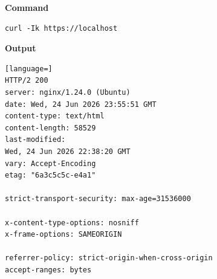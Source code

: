 \documentclass[11pt,a4paper,DIV=16,headings=normal,parskip=half]{scrartcl}
\begin{document}
\noindent
\begin{minipage}[t]{0.32\textwidth}
\textbf{Command}
\begin{lstlisting}
curl -Ik https://localhost
\end{lstlisting}
\end{minipage}
\hfill
\begin{minipage}[t]{0.64\textwidth}
\textbf{Output}
\begin{lstlisting}[language=]
HTTP/2 200
server: nginx/1.24.0 (Ubuntu)
date: Wed, 24 Jun 2026 23:55:51 GMT
content-type: text/html
content-length: 58529
last-modified:
Wed, 24 Jun 2026 22:38:20 GMT
vary: Accept-Encoding
etag: "6a3c5c5c-e4a1"

strict-transport-security: max-age=31536000

x-content-type-options: nosniff
x-frame-options: SAMEORIGIN

referrer-policy: strict-origin-when-cross-origin
accept-ranges: bytes
\end{lstlisting}
\end{minipage}
\end{document}
